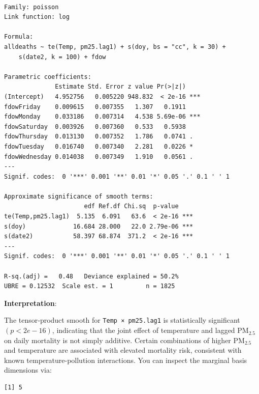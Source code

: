 \documentclass[
  letterpaper,
  DIV=11,
  numbers=noendperiod]{scrreprt}
\newenvironment{Shaded}{\begin{snugshade}}{\end{snugshade}}
\newcommand{\CommentTok}[1]{\textcolor[rgb]{0.37,0.37,0.37}{#1}}
\newcommand{\DecValTok}[1]{\textcolor[rgb]{0.68,0.00,0.00}{#1}}
\newcommand{\NormalTok}[1]{\textcolor[rgb]{0.00,0.23,0.31}{#1}}
\newcommand{\SpecialCharTok}[1]{\textcolor[rgb]{0.37,0.37,0.37}{#1}}
\begin{document}
\begin{verbatim}

Family: poisson 
Link function: log 

Formula:
alldeaths ~ te(Temp, pm25.lag1) + s(doy, bs = "cc", k = 30) + 
    s(date2, k = 100) + fdow

Parametric coefficients:
              Estimate Std. Error z value Pr(>|z|)    
(Intercept)   4.952756   0.005220 948.832  < 2e-16 ***
fdowFriday    0.009615   0.007355   1.307   0.1911    
fdowMonday    0.033186   0.007314   4.538 5.69e-06 ***
fdowSaturday  0.003926   0.007360   0.533   0.5938    
fdowThursday  0.013130   0.007352   1.786   0.0741 .  
fdowTuesday   0.016740   0.007340   2.281   0.0226 *  
fdowWednesday 0.014038   0.007349   1.910   0.0561 .  
---
Signif. codes:  0 '***' 0.001 '**' 0.01 '*' 0.05 '.' 0.1 ' ' 1

Approximate significance of smooth terms:
                      edf Ref.df Chi.sq  p-value    
te(Temp,pm25.lag1)  5.135  6.091   63.6  < 2e-16 ***
s(doy)             16.684 28.000   22.0 2.79e-06 ***
s(date2)           58.397 68.874  371.2  < 2e-16 ***
---
Signif. codes:  0 '***' 0.001 '**' 0.01 '*' 0.05 '.' 0.1 ' ' 1

R-sq.(adj) =   0.48   Deviance explained = 50.2%
UBRE = 0.12532  Scale est. = 1         n = 1825
\end{verbatim}

\textbf{Interpretation}:

The tensor‐product smooth for \texttt{Temp\ ×\ pm25.lag1} is
statistically significant \((p < 2e−16)\), indicating that the joint
effect of temperature and lagged PM\(_{2.5}\) on daily mortality is not
simply additive. Certain combinations of higher PM\(_{2.5}\) and
temperature are associated with elevated mortality risk, consistent with
known temperature-pollution interactions. You can inspect the marginal
basis dimensions via:

\begin{Shaded}
\end{Shaded}

\begin{verbatim}
[1] 5
\end{verbatim}
\end{document}
